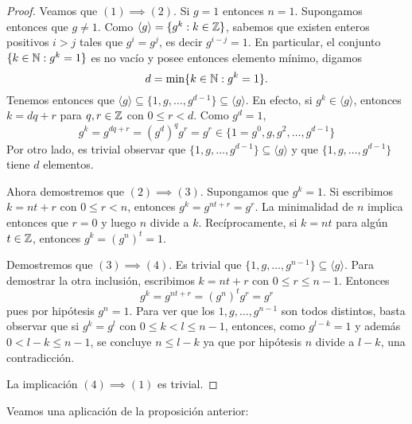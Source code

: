 \begin{proof}
	Veamos que $(1)\implies(2)$. 
	Si $g=1$ entonces $n=1$. Supongamos entonces que $g\ne1$. Como $\langle g\rangle=\{g^k:k\in\mathbb{Z}\}$, 
	sabemos que existen enteros positivos $i>j$ tales que $g^i=g^j$, es decir $g^{i-j}=1$. En particular,
	el conjunto $\{k\in\mathbb{N}:g^k=1\}$ es no vacío y posee entonces elemento mínimo, digamos
	\[
	d=\min\{k\in\mathbb{N}:g^k=1\}.
	\] 
	Tenemos entonces que $\langle g\rangle\subseteq\{1,g,\dots,g^{d-1}\}\subseteq\langle g\rangle$. En efecto, si $g^k\in\langle g\rangle$, entonces $k=dq+r$ para $q,r\in\mathbb{Z}$ con $0\leq r<d$. Como $g^d=1$,  
	\[
	g^k=g^{dq+r}=(g^d)^qg^r=g^r\in\{1=g^0,g,g^2,\dots,g^{d-1}\}
	\]
	Por otro lado, es trivial observar que $\{1,g,\dots,g^{d-1}\}\subseteq \langle g\rangle$ y que 
	$\{1,g,\dots,g^{d-1}\}$ tiene $d$ elementos. 

	Ahora demostremos que $(2)\implies(3)$. Supongamos que $g^k=1$. Si
	escribimos $k=nt+r$ con $0\leq r<n$, entonces $g^k=g^{nt+r}=g^r$. La
	minimalidad de $n$ implica entonces que $r=0$ y luego $n$ divide a $k$.
	Recíprocamente, si $k=nt$ para algún $t\in\mathbb{Z}$, entonces $g^k=(g^n)^t=1$.

	Demostremos que $(3)\implies(4)$. Es trivial que
	$\{1,g,\dots,g^{n-1}\}\subseteq\langle g\rangle$. Para demostrar la otra
	inclusión, escribimos $k=nt+r$ con $0\leq r\leq n-1$. Entonces
	\[
		g^k=g^{nt+r}=(g^n)^tg^r=g^r
	\]
	pues por hipótesis $g^n=1$. Para ver que los 
	$1,g,\dots,g^{n-1}$ son todos distintos, basta observar que si $g^k=g^l$ con $0\leq
	k<l\leq n-1$, entonces, como $g^{l-k}=1$ y además $0<l-k\leq n-1$, se concluye $n\leq l-k$ ya que
	por hipótesis $n$ divide a $l-k$, una contradicción. 
	 
	La implicación $(4)\implies(1)$ es trivial. 
\end{proof}

Veamos una aplicación de la proposición anterior:

